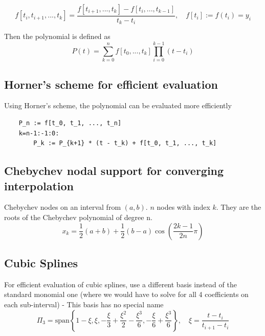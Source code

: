 \documentclass[
    a4paper,
    11pt
]{article}
\begin{document}
\begin{equation}
    f[t_i, t_{i+1}, ..., t_k] =
    \frac{f[t_{i+1}, ..., t_k] - f[t_i, ..., t_{k-1}]}{t_k - t_i},
    \quad
    f[t_i] := f(t_i) = y_i
\end{equation}

Then the polynomial is defined as
\begin{equation}
    P(t) = \sum_{k=0}^{n} f[t_0, ..., t_k] \prod_{i=0}^{k-1}(t - t_i)
\end{equation}

\subsection{Horner's scheme for efficient evaluation}

Using Horner's scheme, the polynomial can be evaluated more efficiently
\begin{verbatim}
    P_n := f[t_0, t_1, ..., t_n]
    k=n-1:-1:0:
        P_k := P_{k+1} * (t - t_k) + f[t_0, t_1, ..., t_k]
\end{verbatim}



\subsection{Chebychev nodal support for converging interpolation}

Chebychev nodes on an interval from $(a,b)$. $n$ nodes with index $k$. They are
the roots of the Chebychev polynomial of degree n.
\begin{equation}
    x_k = \frac{1}{2}(a+b) + \frac{1}{2}(b-a)\cos(\frac{2k-1}{2n}\pi)
\end{equation}

\subsection{Cubic Splines}

For efficient evaluation of cubic splines, use a different basis instead of the
standard monomial one (where we would have to solve for all 4 coefficients on
each sub-interval) - This basis has no special name
\begin{equation}
    \Pi_3 = \text{span}\left\{
        1 - \xi,
        \xi,
        -\frac{\xi}{3}+\frac{\xi^2}{2}-\frac{\xi^3}{6},
        -\frac{\xi}{6} + \frac{\xi^3}{6}
    \right\}, \quad \xi = \frac{t-t_i}{t_{i+1} - t_i}
\end{equation}
\end{document}
